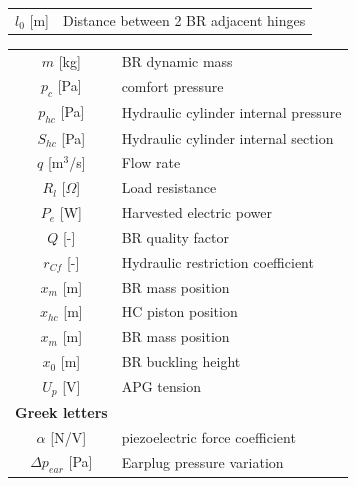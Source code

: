 \documentclass[3p,twocolumn,preprint]{elsarticle}
\begin{document}
\begin{table}
\begin{minipage}{.5\textwidth}
\begin{tabular}{ c  m{6cm} }
		$l_0$ [m]                & Distance between 2 BR adjacent hinges \\
	\end{tabular}
\end{minipage}
\begin{minipage}{.5\textwidth}
\begin{tabular}{ c  m{6cm} }
		$m$ [kg]			     & BR dynamic mass 										   \\
		$p_c$ [Pa]               & comfort pressure                                        \\
		$p_{hc}$ [Pa]            & Hydraulic cylinder internal pressure                    \\
		$S_{hc}$ [Pa]            & Hydraulic cylinder internal section                     \\
		$q$ [m$^3$/s]            & Flow rate                                               \\
		$R_l$ [$\Omega$]         & Load resistance                                         \\
		$P_e$ [W]                & Harvested electric power                                \\
		$Q$ [-]                  & BR quality factor                                       \\
		$r_{Cf}$ [-]             & Hydraulic restriction coefficient                       \\
		$x_m$ [m]                & BR mass position                                        \\
		$x_{hc}$ [m]             & HC piston position                                      \\
		$x_m$ [m]                & BR mass position                                        \\
		$x_0$ [m]                & BR buckling height                                       \\
		$U_p$ [V]                & APG tension                                             \\
		\textbf{Greek letters}   &                                                         \\
		$\alpha$ [N/V]           & piezoelectric force coefficient                         \\
		$\Delta p_{ear}$ [Pa]    & Earplug pressure variation                              \\

\end{tabular}
\end{minipage}
\end{table}
\end{document}
